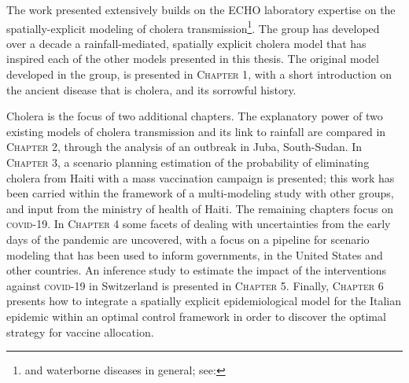 The work presented extensively builds on the ECHO laboratory expertise on the spatially-explicit modeling of cholera transmission\footnote{and waterborne diseases in general; see: }. The group has developed over a decade a rainfall-mediated, spatially explicit cholera model that has inspired each of the other models presented in this thesis. The original model developed in the group, is presented in \textsc{Chapter 1}, with a short introduction on the ancient disease that is cholera, and its sorrowful history.

Cholera is the focus of two additional chapters. The explanatory power of two existing models of cholera transmission and its link to rainfall are compared in \textsc{Chapter 2}, through the analysis of an outbreak in Juba, South-Sudan. In \textsc{Chapter 3}, a scenario planning estimation of the probability of eliminating cholera from Haiti with a mass vaccination campaign is presented; this work has been carried within the framework of a multi-modeling study with other groups, and input from the ministry of health of Haiti.
The remaining chapters focus on \textsc{covid}-19. In \textsc{Chapter 4} some facets of dealing with uncertainties from the early days of the pandemic are uncovered, with a focus on a pipeline for scenario modeling that has been used to inform governments, in the United States and other countries. 
An inference study to estimate the impact of the interventions against \textsc{covid}-19 in Switzerland is presented in \textsc{Chapter 5}.
Finally, \textsc{Chapter 6} presents how to integrate a spatially explicit epidemiological model for the Italian epidemic within an optimal control framework in order to discover the optimal strategy for vaccine allocation.




